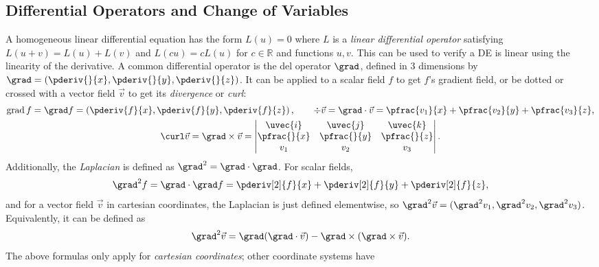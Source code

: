 \documentclass[10pt, a4paper]{article}
\begin{document}
\begin{landscape}

\begin{multicols}{2}
    \section{Differential Operators and Change of Variables}

    A homogeneous linear differential equation has the form \(L(u) = 0\) where \(L\) is a
    \emph{linear differential operator} satisfying \(L(u+v) = L(u) + L(v)\) and
    \(L(cu) = c L(u)\) for \(c \in \mathbb{R}\) and functions \(u, v\). This can be used
    to verify a DE is linear using the linearity of the derivative. A common differential operator
    is the del operator \(\grad\), defined in 3 dimensions by
    \(\grad = (\pderiv{}{x}, \pderiv{}{y}, \pderiv{}{z})\). It can be applied to a scalar field
    \(f\) to get \(f\)'s gradient field, or be dotted or crossed with a vector field \(\vec{v}\)
    to get its \emph{divergence} or \emph{curl}:
    \begin{gather*}
        \operatorname{grad} f = \grad f = \left(\pderiv{f}{x}, \pderiv{f}{y}, \pderiv{f}{z}\right),
        \qquad
        \div \vec{v} = \grad \cdot \vec{v} = \pfrac{v_1}{x} + \pfrac{v_2}{y} + \pfrac{v_3}{z}, \\
        \curl \vec{v} = \grad \times \vec{v} = 
        \begin{vmatrix}
            \uvec{i} & \uvec{j} & \uvec{k} \\
            \pfrac{}{x} & \pfrac{}{y} & \pfrac{}{z} \\
            v_1 & v_2 & v_3
        \end{vmatrix}.
    \end{gather*}
    Additionally, the \emph{Laplacian} is defined as \(\grad^2 = \grad \cdot \grad\). For scalar fields,
    \[
        \grad^2 f = \grad \cdot \grad f = \pderiv[2]{f}{x} + \pderiv[2]{f}{y} + \pderiv[2]{f}{z},
    \]
    and for a vector field \(\vec{v}\) in cartesian coordinates, the Laplacian is just defined
    elementwise, so \(\grad^2 \vec{v} = (\grad^2 v_1, \grad^2 v_2, \grad^2 v_3)\).
    Equivalently, it can be defined as
    \[
        \grad^2 \vec{v} = \grad(\grad \cdot \vec{v}) - \grad \times (\grad \times \vec{v}).
    \]
    The above formulas only apply for \emph{cartesian coordinates}; other coordinate systems have

\end{multicols}
\end{landscape}
\end{document}
